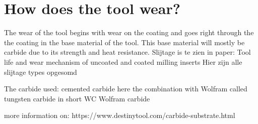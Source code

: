 \section{How does the tool wear?}
The wear of the tool begins with wear on the coating and goes right through the the coating in the base material of the tool. 
This base material will mostly be carbide due to its strength and heat resistance. 
	Slijtage is te zien in paper: Tool life and wear mechanism of uncoated and coated milling inserts
	Hier zijn alle slijtage types opgesomd
	
	The carbide used:
		cemented carbide here the combination with Wolfram called tungsten carbide
		in short WC Wolfram carbide
		
		more information on:
			https://www.destinytool.com/carbide-substrate.html